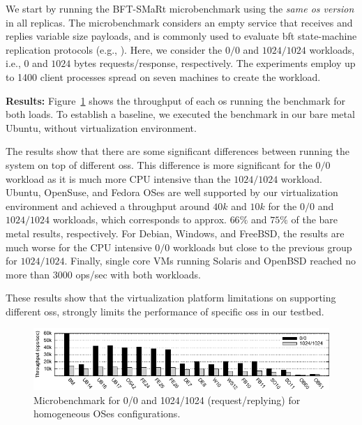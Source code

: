 We start by running the BFT-SMaRt microbenchmark using the \emph{same \gls{os} version} in all replicas.
The microbenchmark considers an empty service that receives and replies variable size payloads, and is commonly used to evaluate \gls{bft} state-machine replication protocols (e.g., \cite{Castro:1999,Bessani:2014,Liu:2016,Behl:2015,Behl:2017}). 
Here, we consider the $0/0$ and $1024/1024$ workloads, i.e., $0$ and $1024$ bytes requests/response, respectively.
The experiments employ up to 1400 client processes spread on seven machines to create the workload.

\textbf{Results:}
Figure~\ref{fig:bftsmart} shows the throughput of each \gls{os} running the benchmark for both loads.
To establish a baseline, we executed the benchmark in our bare metal Ubuntu, without \system virtualization environment.

The results show that there are some significant differences between running the system on top of different \glspl{os}.
This difference is more significant for the $0/0$ workload as it is much more CPU intensive than the $1024/1024$ workload.
Ubuntu, OpenSuse, and Fedora OSes are well supported by our virtualization environment and achieved a throughput around $40k$ and $10k$ for the $0/0$ and $1024/1024$ workloads, which corresponds to approx. $66\%$ and $75\%$ of the bare metal results, respectively.
For Debian, Windows, and FreeBSD, the results are much worse for the CPU intensive $0/0$ workloads but close to the previous group for $1024/1024$.
Finally, single core VMs running Solaris and OpenBSD reached no more than $3000$ ops/sec with both workloads.

These results show that the virtualization platform limitations on supporting different \glspl{os}, strongly limits the performance of specific \glspl{os} in our testbed.

\begin{figure}[h]
\begin{center}
\includegraphics[width=\columnwidth]{images/gnuplot/vagrant/runs_new_new/throughput.pdf}
\caption{Microbenchmark for 0/0 and 1024/1024 (request/replying) for homogeneous OSes configurations.}
\label{fig:bftsmart}
\end{center}
\end{figure}

